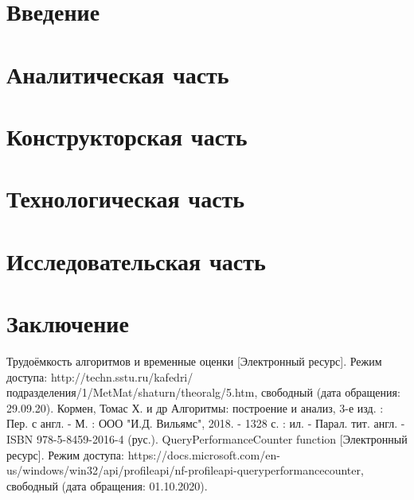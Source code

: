 \documentclass[12pt]{report}
\begin{document}
	\renewcommand\bibname{Список литературы}
	
	
	
	\tableofcontents
	\newpage
	
	\chapter*{Введение}
	
	\newpage
	
	\chapter{Аналитическая часть}
	
	\newpage
	
	\chapter{Конструкторская часть}
	
	\newpage
	
	\chapter{Технологическая часть}
	
	\newpage
	
	\chapter{Исследовательская часть}
	\newpage
	
	\chapter*{Заключение}
	\newpage
	
	\begin{thebibliography}{2}
		 Трудоёмкость алгоритмов и временные оценки [Электронный ресурс]. Режим доступа: http://techn.sstu.ru/kafedri/подразделения/1/MetMat/shaturn/theoralg/5.htm, свободный (дата обращения: 29.09.20).
		 Кормен, Томас Х. и др Алгоритмы: построение и анализ, 3-е изд. : Пер. с англ. - М. : ООО "И.Д. Вильямс", 2018. - 1328 с. : ил. - Парал. тит. англ. -  ISBN 978-5-8459-2016-4 (рус.).
		 QueryPerformanceCounter function [Электронный ресурс]. Режим доступа: https://docs.microsoft.com/en-us/windows/win32/api/profileapi/nf-profileapi-queryperformancecounter, свободный (дата обращения: 01.10.2020).
	\end{thebibliography}
\end{document}
